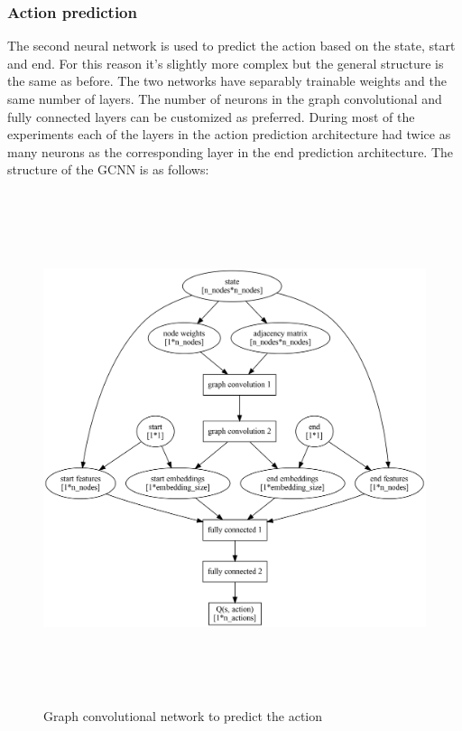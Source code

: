 \documentclass[
]{elteikthesis}[2023/04/10]
\begin{document}
\subsubsection*{Action prediction}

The second neural network is used to predict the action based on the
state, start and end. For this reason it's slightly more complex but
the general structure is the same as before. The two networks have
separably trainable weights and the same number of layers. The number
of neurons in the graph convolutional and fully connected layers can
be customized as preferred. During most of the experiments each of
the layers in the action prediction architecture had twice as many
neurons as the corresponding layer in the end prediction architecture.
The structure of the GCNN is as follows:

\begin{figure}[H]
\begin{centering}
\includegraphics[width=25cm,height=15cm,keepaspectratio]{images/gcnn_action}
\par\end{centering}
\caption{Graph convolutional network to predict the action}

\end{figure}
\end{document}
